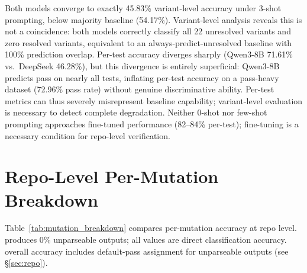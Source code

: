 Both models converge to exactly 45.83\% variant-level accuracy under 3-shot prompting, below majority baseline (54.17\%). Variant-level analysis reveals this is not a coincidence: both models correctly classify all 22 unresolved variants and zero resolved variants, equivalent to an always-predict-unresolved baseline with 100\% prediction overlap. Per-test accuracy diverges sharply (Qwen3-8B 71.61\% vs.\ DeepSeek 46.28\%), but this divergence is entirely superficial: Qwen3-8B predicts pass on nearly all tests, inflating per-test accuracy on a pass-heavy dataset (72.96\% pass rate) without genuine discriminative ability. Per-test metrics can thus severely misrepresent baseline capability; variant-level evaluation is necessary to detect complete degradation. Neither 0-shot nor few-shot prompting approaches fine-tuned performance (82--84\% per-test); fine-tuning is a necessary condition for repo-level verification.

\section{Repo-Level Per-Mutation Breakdown}
\label{app:repo_mutation}

Table~\ref{tab:mutation_breakdown} compares per-mutation accuracy at repo level. \cls{} produces 0\% unparseable outputs; all values are direct classification accuracy. \cwm{} overall accuracy includes default-pass assignment for unparseable outputs (see \S\ref{sec:repo}).

\begin{table}[h]
\centering
\small
\caption{Per-mutation test accuracy (\%) at repo level (SWE-bench Verified, $n{=}9{,}784$). \cls{} 8B reports two seeds; $\Delta$ is mean 4B$\to$8B gain for \cls{}. \cwm{} 4B per-mutation overall accuracy omitted for non-gold mutations due to low parse rates (4.4--56.9\%, Table~\ref{tab:cwm_mutation_parse}); gold overall accuracy derived from parse rate 43.5\% and parseable accuracy 23.5\%.}
\label{tab:mutation_breakdown}
\end{table}

